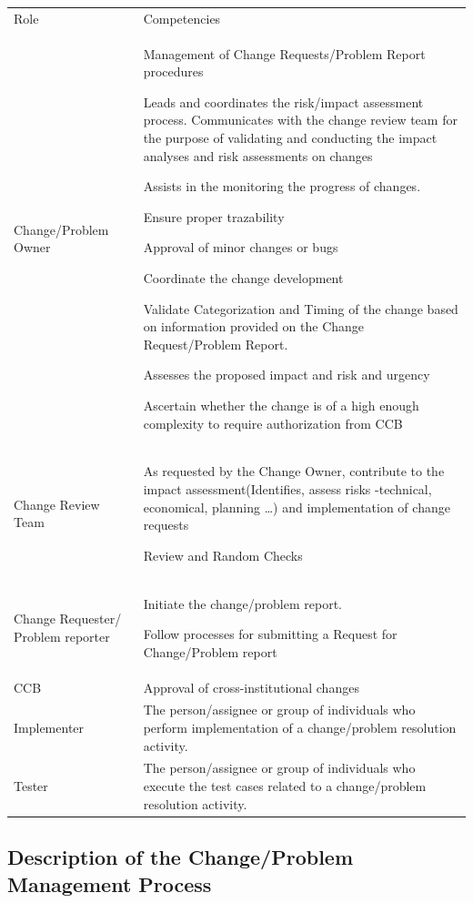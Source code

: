 \documentclass{template/openetcs_article}
\begin{document}
\begin{flushleft}
\begin{tabular}{|m{}|m{10cm}|}
\hline
\rowcolor{myblue}
\multicolumn{2}{|c|}{Roles} \\\hline
\rowcolor{lightgray}
Role &
Competencies \\\hline
Change/Problem Owner &
Management of Change Requests/Problem Report procedures

Leads and coordinates the risk/impact assessment process. Communicates with the change review team for the purpose of validating and conducting the impact analyses and risk assessments on changes

Assists in the monitoring the progress of changes.

Ensure proper trazability 

Approval of minor changes or bugs

Coordinate the change development

Validate Categorization and Timing of the change based on information provided on the Change Request/Problem Report.

Assesses the proposed impact and risk and urgency

Ascertain whether the change is of a high enough complexity to require authorization from CCB\\\hline
Change Review Team &
As requested by the Change Owner, contribute to the impact assessment(Identifies, assess risks -technical, economical, planning {\dots}) and implementation of change requests

Review and Random Checks \\\hline
Change Requester/ Problem reporter &
Initiate the change/problem report.

Follow processes for submitting a Request for Change/Problem report\\\hline
CCB &
Approval of cross-institutional changes \\\hline
Implementer &
The person/assignee or group of individuals who perform
implementation of a change/problem resolution activity.\\\hline
Tester &
The person/assignee or group of individuals who execute
the test cases related to a change/problem resolution activity.\\\hline
\end{tabular}
\end{flushleft}


\subsection{Description of the Change/Problem Management Process}
\end{document}
